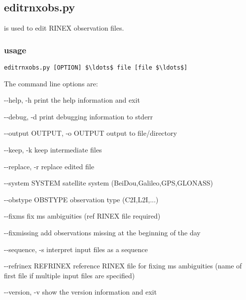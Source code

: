 \subsection{editrnxobs.py}

\hypertarget{h:editrnxobs}{}

 is used to edit RINEX observation files. 

\subsubsection{usage}

\begin{lstlisting}[mathescape=true]
editrnxobs.py [OPTION] $\ldots$ file [file $\ldots$] 
\end{lstlisting}
The command line options are:
\begin{description*}
	\item[-{}-help, -h]            print the help information and exit
  \item[-{}-debug, -d]           print debugging information to stderr
  \item[-{}-output OUTPUT, -o OUTPUT]  output to file/directory
  \item[-{}-keep, -k]            keep intermediate files
  \item[-{}-replace, -r]         replace edited file
  \item[-{}-system SYSTEM ]      satellite system (BeiDou,Galileo,GPS,GLONASS)
  \item[-{}-obstype OBSTYPE]     observation type (C2I,L2I,...)
  \item[-{}-fixms ]              fix ms ambiguities (ref RINEX file required)
  \item[-{}-fixmissing ]         add observations missing at the beginning of the day
  \item[-{}-sequence, -s ]       interpret input files as a sequence
  \item[-{}-refrinex REFRINEX ]  reference RINEX file for fixing ms ambiguities (name of first file if multiple input files are specified)
  \item[-{}-version, -v ]        show the version information and exit
\end{description*}

